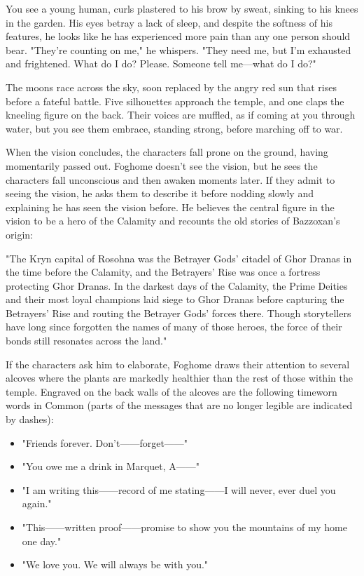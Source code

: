 \documentclass[10pt,a4paper,twoside,bg=print,twocolumn,openany,nodeprecatedcode]{dndbook}
\begin{document}
\begin{DndReadAloud}{}
You see a young human, curls plastered to his brow by sweat, sinking to his knees in the garden. His eyes betray a lack of sleep, and despite the softness of his features, he looks like he has experienced more pain than any one person should bear. "They're counting on me," he whispers. "They need me, but I'm exhausted and frightened. What do I do? Please. Someone tell me—what do I do?"

The moons race across the sky, soon replaced by the angry red sun that rises before a fateful battle. Five silhouettes approach the temple, and one claps the kneeling figure on the back. Their voices are muffled, as if coming at you through water, but you see them embrace, standing strong, before marching off to war.

\end{DndReadAloud}

When the vision concludes, the characters fall prone on the ground, having momentarily passed out. Foghome doesn't see the vision, but he sees the characters fall unconscious and then awaken moments later. If they admit to seeing the vision, he asks them to describe it before nodding slowly and explaining he has seen the vision before. He believes the central figure in the vision to be a hero of the Calamity and recounts the old stories of Bazzoxan's origin:

\begin{DndReadAloud}{}
"The Kryn capital of Rosohna was the Betrayer Gods' citadel of Ghor Dranas in the time before the Calamity, and the Betrayers' Rise was once a fortress protecting Ghor Dranas. In the darkest days of the Calamity, the Prime Deities and their most loyal champions laid siege to Ghor Dranas before capturing the Betrayers' Rise and routing the Betrayer Gods' forces there. Though storytellers have long since forgotten the names of many of those heroes, the force of their bonds still resonates across the land."

\end{DndReadAloud}

If the characters ask him to elaborate, Foghome draws their attention to several alcoves where the plants are markedly healthier than the rest of those within the temple. Engraved on the back walls of the alcoves are the following timeworn words in Common (parts of the messages that are no longer legible are indicated by dashes):


\begin{itemize}
\item "Friends forever. Don't——forget——"
\item "You owe me a drink in Marquet, A——"
\item "I am writing this——record of me stating——I will never, ever duel you again."
\item "This——written proof——promise to show you the mountains of my home one day."
\item "We love you. We will always be with you."
\end{itemize}
\end{document}

